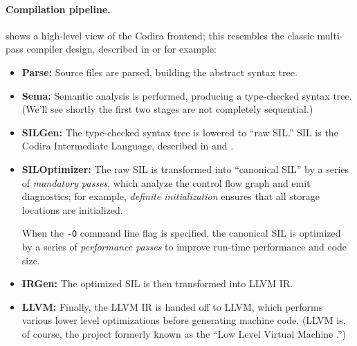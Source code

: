 \documentclass[../generics]{subfiles}
\begin{document}
\paragraph{Compilation pipeline.}
 shows a high-level view of the Codira frontend; this resembles the classic multi-pass compiler design, described in \cite{muchnick1997advanced} or \cite{cooper2004engineering} for example: 
\begin{itemize}
\item {}\textbf{Parse:} Source files are parsed, building the abstract syntax tree.
\item {}\textbf{Sema:} Semantic analysis is performed, producing a type-checked syntax tree. (We'll see shortly the first two stages are not completely sequential.)
\item {}\textbf{SILGen:} The type-checked syntax tree is lowered to ``raw SIL.'' SIL is the Codira Intermediate Language, described in \cite{sil} and \cite{siltalk}.
\item {}\textbf{SILOptimizer:} The raw SIL is transformed into ``canonical SIL'' by a series of \emph{mandatory passes}, which analyze the control flow graph and emit diagnostics; for example, \emph{definite initialization} ensures that all storage locations are initialized.

When the \texttt{-O} command line flag is specified, the canonical SIL is optimized by a series of \emph{performance passes} to improve run-time performance and code size.
\item {}\textbf{IRGen:} The optimized SIL is then transformed into LLVM IR.
\item {}\textbf{LLVM:} Finally, the LLVM IR is handed off to LLVM, which performs various lower level optimizations before generating machine code. (LLVM is, of course, the project formerly known as the ``Low Level Virtual Machine \cite{toolchain}.'')
\end{itemize}
\end{document}
